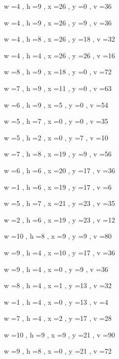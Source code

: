 \documentclass[11pt]{article}
\begin{document}


w =4 , h =9 , x =26 , y =0 , v =36
\par
w =4 , h =9 , x =26 , y =9 , v =36
\par
w =4 , h =8 , x =26 , y =18 , v =32
\par
w =4 , h =4 , x =26 , y =26 , v =16
\par
w =8 , h =9 , x =18 , y =0 , v =72
\par
w =7 , h =9 , x =11 , y =0 , v =63
\par
w =6 , h =9 , x =5 , y =0 , v =54
\par
w =5 , h =7 , x =0 , y =0 , v =35
\par
w =5 , h =2 , x =0 , y =7 , v =10
\par
w =7 , h =8 , x =19 , y =9 , v =56
\par
w =6 , h =6 , x =20 , y =17 , v =36
\par
w =1 , h =6 , x =19 , y =17 , v =6
\par
w =5 , h =7 , x =21 , y =23 , v =35
\par
w =2 , h =6 , x =19 , y =23 , v =12
\par
w =10 , h =8 , x =9 , y =9 , v =80
\par
w =9 , h =4 , x =10 , y =17 , v =36
\par
w =9 , h =4 , x =0 , y =9 , v =36
\par
w =8 , h =4 , x =1 , y =13 , v =32
\par
w =1 , h =4 , x =0 , y =13 , v =4
\par
w =7 , h =4 , x =2 , y =17 , v =28
\par
w =10 , h =9 , x =9 , y =21 , v =90
\par
w =9 , h =8 , x =0 , y =21 , v =72
\par
\newpage
\end{document}
